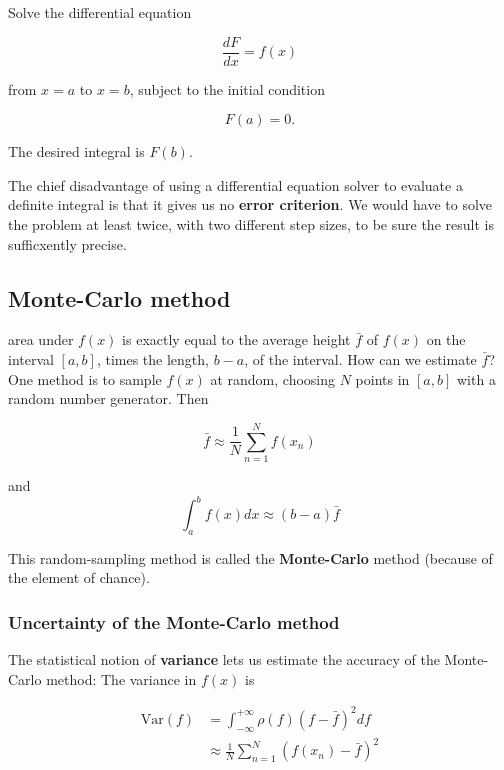 Solve the differential equation

\begin{equation}
\frac{dF}{dx} = f(x)
\end{equation}

from $x = a$ to $x = b$, subject to the initial condition

\begin{equation*}
F(a) = 0.
\end{equation*}

The desired integral is $F(b)$.

The chief disadvantage of using a differential equation solver to evaluate a definite integral is that it gives us no \textbf{error criterion}. We would have to solve the problem at least twice, with two different step sizes, to be sure the result is sufficxently precise.

\subsection{Monte-Carlo method}
 area under $f(x)$ is exactly equal to the average height $\bar{f}$ of $f(x)$ on the interval $[a, b]$, times the length, $b-a$, of the interval. How can we estimate $\bar{f}$? One method is to sample $f(x)$ at random, choosing $N$ points in $[a,b]$ with a random number generator. Then

\begin{equation}
\bar{f} \approx \frac{1}{N} \sum_{n=1}^{N} f(x_n)
\end{equation}

and
\begin{equation}
\int_{a}^{b} f(x) dx \approx (b-a)\bar{f}
\end{equation}

This random-sampling method is called the \textbf{Monte-Carlo} method (because of the element of chance).

\subsubsection{Uncertainty of the Monte-Carlo method}
The statistical notion of \textbf{variance} lets us estimate the accuracy of the Monte-Carlo method: The variance in $f(x)$ is

\begin{equation}
    \begin{split}
    \text{Var}(f) &= \int_{-\infty}^{+\infty} \rho(f) \left(f- \bar{f}\right)^2 df \\
    & \approx \frac{1}{N} \sum_{n=1}^{N} \left(f(x_n) - \bar{f}\right)^2
    \end{split}
\end{equation}

